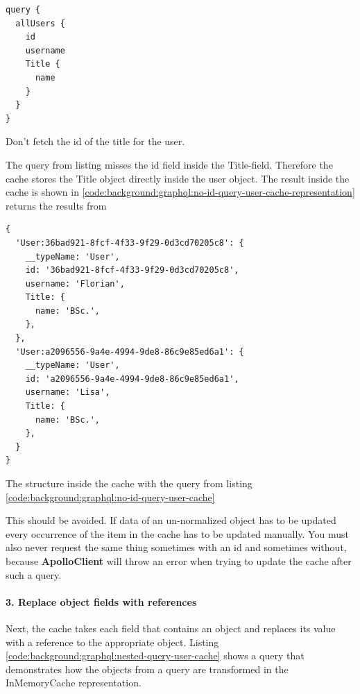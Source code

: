 \ifshowListings
\begin{listing}[H]
    \begin{verbatim}
query {
  allUsers {
    id
    username
    Title {
      name
    }
  }
}
    \end{verbatim}
    \caption{Don't fetch the id of the title for the user.}\label{code:background:graphql:no-id-query-user-cache}
\end{listing}
\fi

\noindent The query from listing misses the id field inside the Title-field. Therefore the cache stores the Title object directly inside the user object. The result inside the cache is shown in 
\ref{code:background:graphql:no-id-query-user-cache-representation} returns the results from 

\ifshowListings
\begin{listing}[H]
    \begin{verbatim}
{
  'User:36bad921-8fcf-4f33-9f29-0d3cd70205c8': {
    __typeName: 'User',
    id: '36bad921-8fcf-4f33-9f29-0d3cd70205c8',
    username: 'Florian',
    Title: {
      name: 'BSc.',
    },
  },
  'User:a2096556-9a4e-4994-9de8-86c9e85ed6a1': {
    __typeName: 'User',
    id: 'a2096556-9a4e-4994-9de8-86c9e85ed6a1',
    username: 'Lisa',
    Title: {
      name: 'BSc.',
    },
  }
}
    \end{verbatim}
    \caption{The structure inside the cache with the query from listing \ref{code:background:graphql:no-id-query-user-cache}}\label{code:background:graphql:no-id-query-user-cache-representation}
\end{listing}
\fi

\noindent This should be avoided. If data of an un-normalized object has to be updated every occurrence of the item in the cache has to be updated manually. You must also never request the same thing sometimes with an id and sometimes without, because \textbf{ApolloClient} will throw an error when trying to update the cache after such a query.

\paragraph{3. Replace object fields with references}

Next, the cache takes each field that contains an object and replaces its value with a reference to the appropriate object. Listing \ref{code:background:graphql:nested-query-user-cache} shows a query that demonstrates how the objects from a query are transformed in the InMemoryCache representation.

